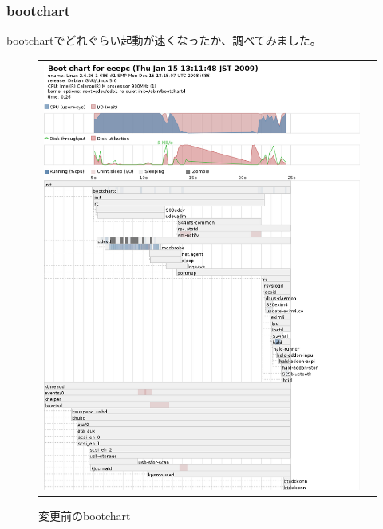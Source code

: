 \documentclass[mingoth,a4paper]{jsarticle}
\begin{document}
\subsubsection{bootchart}
bootchartでどれぐらい起動が速くなったか、調べてみました。

\begin{figure}[htbp]
  \begin{tabular}{cc}
   \begin{minipage}{0.5\textwidth}
    \begin{center}
     \includegraphics[scale=0.45]{image200901/bootchart-eeepc.png}
     \caption{変更前のbootchart}
     \label{fig:bootchart-eeepc}
     

\end{center}
\end{minipage}
\end{tabular}
\end{figure}
\end{document}
